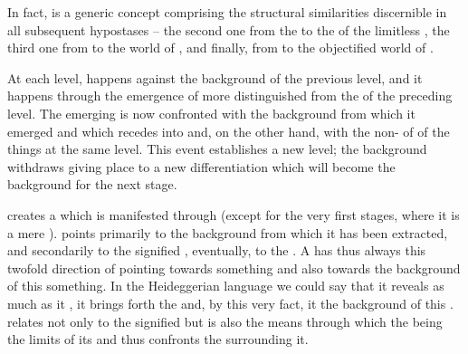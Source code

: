 \pa In fact,  is a generic concept comprising the structural
similarities discernible in all subsequent hypostases -- the second one from the
 to the  of the limitless
, the third one from  to the  world of
, and finally, from  to the {objectified} world
of .

At each level,  happens against the background of the previous
level, and it happens through the emergence of more  
distinguished from the  of the preceding level. The emerging
 is now confronted with the background from which it emerged and
which recedes into  and, on the other hand, with the
non- of  of the things  at the
same level.  This event establishes a new level; the background withdraws giving
place to a new differentiation which will become the background for the next
stage.

 creates a  which is manifested through 
(except for the very first stages, where it is a mere ).
 points primarily to the background from which it has been extracted,
and secondarily to the signified , eventually, to the
 .  A  has thus always this twofold direction
of pointing towards something and also towards the background of this something.
In the Heideggerian language we could say that it reveals as much as it
, it brings forth the  and, by this very fact, it
 the  background of this .  
relates not only to the signified but is also the means through which the
 being  the limits of its  and thus
confronts the  surrounding it.


